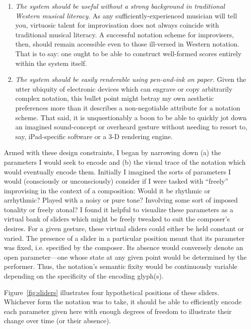 \begin{enumerate}[label=(\roman*)]
        \item \textit{The system should be useful without a strong background in traditional Western musical literacy.} As any sufficiently-experienced musician will tell you, virtuosic talent for improvisation does not always coincide with traditional musical literacy. A successful notation scheme for improvisers, then, should remain accessible even to those ill-versed in Western notation. That is to say: one ought to be able to construct well-formed scores entirely within the system itself.
        
        \item \textit{The system should be easily renderable using pen-and-ink on paper.} Given the utter ubiquity of electronic devices which can engrave or copy arbitrarily complex notation, this bullet point might betray my own aesthetic preferences more than it describes a non-negotiable attribute for a notation scheme. That said, it is unquestionably a boon to be able to quickly jot down an imagined sound-concept or overheard gesture without needing to resort to, say, iPad-specific software or a 3-D rendering engine.
        
    \end{enumerate}

    Armed with these design constraints, I began by narrowing down (a) the parameters I would seek to encode and (b) the visual trace of the notation which would eventually encode them. Initially I imagined the sorts of parameters I would (consciously or unconsciously) consider if I were tasked with ``freely'' improvising in the context of a composition: Would it be rhythmic or arrhythmic? Played with a noisy or pure tone? Involving some sort of imposed tonality or freely atonal? I found it helpful to visualize these parameters as a virtual bank of sliders which might be freely tweaked to suit the composer's desires. For a given gesture, these virtual sliders could either be held constant or varied. The presence of a slider in a particular position meant that its parameter was fixed, i.e. specified by the composer. Its absence would conversely denote an open parameter---one whose state at any given point would be determined by the performer. Thus, the notation's semantic fixity would be continuously variable depending on the specificity of the encoding glyph(s).

    Figure~\ref{fig:sliders} illustrates four hypothetical positions of these sliders. Whichever form the notation was to take, it should be able to efficiently encode each parameter given here with enough degrees of freedom to illustrate their change over time (or their absence).


